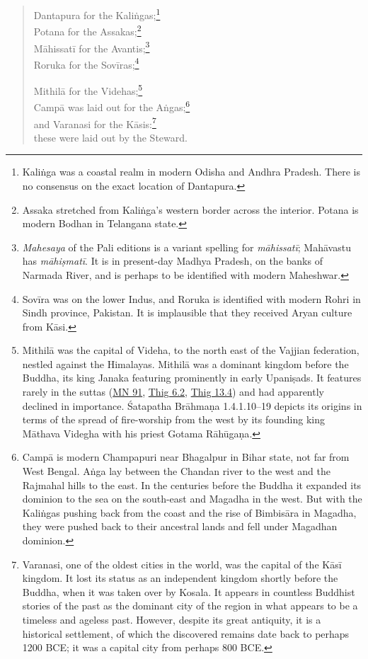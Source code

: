 \documentclass[12pt,openany]{book}%
\begin{document}
\begin{verse}%
Dantapura for the \textsanskrit{Kaliṅgas};\footnote{\textsanskrit{Kaliṅga} was a coastal realm in modern Odisha and Andhra Pradesh. There is no consensus on the exact location of Dantapura. } \\
Potana for the Assakas;\footnote{Assaka stretched from \textsanskrit{Kaliṅga}’s western border across the interior. Potana is modern Bodhan in Telangana state. } \\
\textsanskrit{Māhissatī} for the Avantis;\footnote{\textit{Mahesaya} of the Pali editions is a variant spelling for \textit{\textsanskrit{māhissatī}}; \textsanskrit{Mahāvastu} has \textit{\textsanskrit{māhiṣmatī}}. It is in present-day Madhya Pradesh, on the banks of Narmada River, and is perhaps to be identified with modern Maheshwar. } \\
Roruka for the \textsanskrit{Sovīras};\footnote{\textsanskrit{Sovīra} was on the lower Indus, and Roruka is identified with modern Rohri in Sindh province, Pakistan. It is implausible that they received Aryan culture from \textsanskrit{Kāsi}. } 

\textsanskrit{Mithilā} for the Videhas;\footnote{\textsanskrit{Mithilā} was the capital of Videha, to the north east of the Vajjian federation, nestled against the Himalayas. \textsanskrit{Mithilā} was a dominant kingdom before the Buddha, its king Janaka featuring prominently in early \textsanskrit{Upaniṣads}. It features rarely in the suttas (\href{https://suttacentral.net/mn91/en/sujato}{MN 91}, \href{https://suttacentral.net/thig6.2/en/sujato}{Thig 6.2}, \href{https://suttacentral.net/thig13.4/en/sujato}{Thig 13.4}) and had apparently declined in importance. Śatapatha \textsanskrit{Brāhmaṇa} 1.4.1.10–19 depicts its origins in terms of the spread of fire-worship from the west by its founding king \textsanskrit{Māthava} Videgha with his priest Gotama \textsanskrit{Rāhūgaṇa}. } \\
\textsanskrit{Campā} was laid out for the \textsanskrit{Aṅgas};\footnote{\textsanskrit{Campā} is modern Champapuri near Bhagalpur in Bihar state, not far from West Bengal. \textsanskrit{Aṅga} lay between the Chandan river to the west and the Rajmahal hills to the east. In the centuries before the Buddha it expanded its dominion to the sea on the south-east and Magadha in the west. But with the \textsanskrit{Kaliṅgas} pushing back from the coast and the rise of \textsanskrit{Bimbisāra} in Magadha, they were pushed back to their ancestral lands and fell under Magadhan dominion. } \\
and Varanasi for the \textsanskrit{Kāsis}:\footnote{Varanasi, one of the oldest cities in the world, was the capital of the \textsanskrit{Kāsī} kingdom. It lost its status as an independent kingdom shortly before the Buddha, when it was taken over by Kosala. It appears in countless Buddhist stories of the past as the dominant city of the region in what appears to be a timeless and ageless past. However, despite its great antiquity, it is a historical settlement, of which the discovered remains date back to perhaps 1200 BCE; it was a capital city from perhaps 800 BCE. } \\
these were laid out by the Steward. 


\end{verse}
\end{document}
